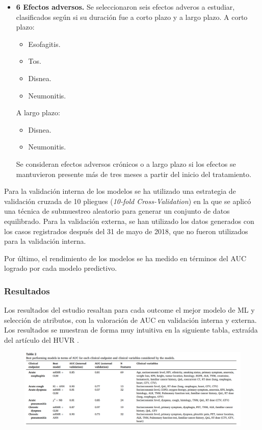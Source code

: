 \begin{itemize}
    \item \textbf{6 Efectos adversos.} Se seleccionaron seis efectos adveros a estudiar, clasificados según si su duración fue a corto plazo y a largo plazo. A corto plazo:
    \begin{itemize}[label={--}]
        \item Esofagitis.
        \item Tos.
        \item Disnea. 
        \item Neumonitis. 
    \end{itemize}
    A largo plazo:
    \begin{itemize}[label={--}]
        \item Disnea. 
        \item Neumonitis. 
    \end{itemize}
    Se consideran efectos adversos crónicos o a largo plazo si los efectos se mantuvieron presente más de tres meses a partir del inicio del tratamiento.
\end{itemize}

Para la validación interna de los modelos se ha utilizado una estrategia de validación cruzada de 10 pliegues (\textit{10-fold Cross-Validation}) en la que se aplicó una técnica de submuestreo aleatorio para generar un conjunto de datos equilibrado. Para la validación externa, se han utilizado los datos generados con los casos registrados después del 31 de mayo de 2018, que no fueron utilizados para la validación interna. 

Por último, el rendimiento de los modelos se ha medido en términos del AUC logrado por cada modelo predictivo.

\subsubsection{Resultados}

   Los resultados del estudio resaltan para cada outcome el mejor modelo de ML y selección de atributos, con la valoración de AUC en validación interna y externa. Los resultados se muestran de forma muy intuitiva en la siguiente tabla, extraída del artículo del HUVR \cite{nunez2023benchmarking}.

\begin{figure}[H]
    \centering
    \includegraphics[width=1\textwidth]{tables/nune2023table2.png}
    \label{table:nune2023table2}
\end{figure}


